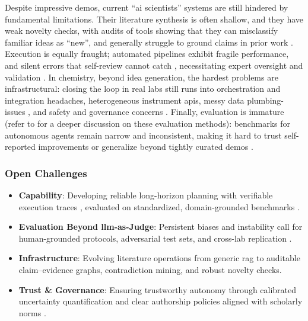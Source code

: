Despite impressive demos, current \enquote{\gls{ai} scientists} systems are still hindered by fundamental limitations. 
Their literature synthesis is often shallow, and they have weak novelty checks, with audits of tools showing that they can misclassify familiar ideas as \enquote{new}, and generally struggle to ground claims in prior work \autocite{beel2025evaluating}. 
Execution is equally fraught; automated pipelines exhibit fragile performance, and silent errors that self-review cannot catch \autocite{luo2025automate3}, necessitating expert oversight and validation \autocite{gottweis2025towards}. 
In chemistry, beyond idea generation, the hardest problems are infrastructural: closing the loop in real labs still runs into orchestration and integration headaches, heterogeneous instrument \glspl{api}, messy data plumbing-issues \autocite{Canty2025science, fehlis2025accelerating}, and safety and governance concerns \autocite{Leong2024steering}.
Finally, evaluation is immature (refer to  for a deeper discussion on these evaluation methods): benchmarks for autonomous agents remain narrow and inconsistent, making it hard to trust self-reported improvements or generalize beyond tightly curated demos \autocite{yehudai2025survey}.

\subsubsection{Open Challenges}


\begin{itemize}
    \item \textbf{Capability}: Developing reliable long-horizon planning with verifiable execution traces \autocite{starace2025paperbench0}, evaluated on standardized, domain-grounded benchmarks \autocite{yehudai2025survey}.
    \item \textbf{Evaluation Beyond \gls{llm}-as-Judge}: Persistent biases and instability call for human-grounded protocols, adversarial test sets, and cross-lab replication \autocite{thakur2024judging, starace2025paperbench0}.
    \item \textbf{Infrastructure}: Evolving literature operations from generic \gls{rag} to auditable claim–evidence graphs, contradiction mining, and robust novelty checks.
    \item \textbf{Trust \& Governance}: Ensuring trustworthy autonomy through calibrated uncertainty quantification and clear authorship policies aligned with scholarly norms \autocite{ACS_AI_Policy_2024}.
\end{itemize}


